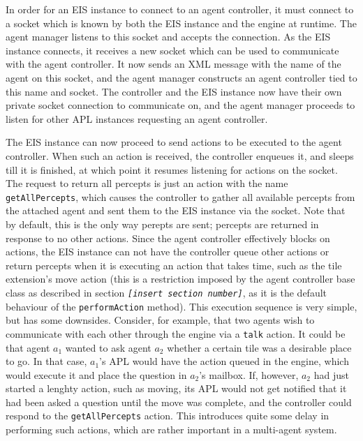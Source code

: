 In order for an EIS instance to connect to an agent controller, it
must connect to a socket which is known by both the EIS instance and
the engine at runtime. The agent manager listens to this socket and
accepts the connection. As the EIS instance connects, it receives
a new socket which can be used to communicate with the agent controller.
It now sends an XML message with the name of the agent on this socket,
and the agent manager constructs an agent controller tied to this
name and socket. The controller and the EIS instance now have their
own private socket connection to communicate on, and the agent manager
proceeds to listen for other APL instances requesting an agent controller.

The EIS instance can now proceed to send actions to be executed to
the agent controller. When such an action is received, the controller
enqueues it, and sleeps till it is finished, at which point it resumes
listening for actions on the socket. The request to return all percepts
is just an action with the name \texttt{getAllPercepts}, which causes
the controller to gather all available percepts from the attached
agent and sent them to the EIS instance via the socket. Note that
by default, this is the only way perepts are sent; percepts are returned
in response to no other actions. Since the agent controller effectively
blocks on actions, the EIS instance can not have the controller queue
other actions or return percepts when it is executing an action that
takes time, such as the tile extension's move action (this is a restriction
imposed by the agent controller base class as described in section
\texttt{\emph{{[}insert section number{]}}}, as it is the default
behaviour of the \texttt{performAction} method). This execution sequence
is very simple, but has some downsides. Consider, for example, that
two agents wish to communicate with each other through the engine
via a \texttt{talk} action. It could be that agent $a_{1}$ wanted
to ask agent $a_{2}$ whether a certain tile was a desirable place
to go. In that case, $a_{1}$'s APL would have the action queued in
the engine, which would execute it and place the question in $a_{2}$'s
mailbox. If, however, $a_{2}$ had just started a lenghty action,
such as moving, its APL would not get notified that it had been asked
a question until the move was complete, and the controller could respond
to the \texttt{getAllPercepts} action. This introduces quite some
delay in performing such actions, which are rather important in a
multi-agent system. 

